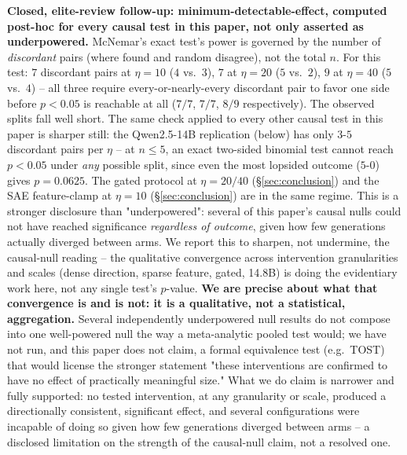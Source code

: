 \documentclass[onecolumn]{jmlr}
\begin{document}
\textbf{Closed, elite-review follow-up: minimum-detectable-effect,
computed post-hoc for every causal test in this paper, not only
asserted as underpowered.} McNemar's exact test's power is governed by
the number of \emph{discordant} pairs (where found and random
disagree), not the total $n$. For this test: $7$ discordant pairs at
$\eta=10$ ($4$ vs.\ $3$), $7$ at $\eta=20$ ($5$ vs.\ $2$), $9$ at
$\eta=40$ ($5$ vs.\ $4$) -- all three require every-or-nearly-every
discordant pair to favor one side before $p<0.05$ is reachable at all
($7/7$, $7/7$, $8/9$ respectively). The observed splits fall well short.
The same check applied to every other causal test in this paper is
sharper still: the Qwen2.5-14B replication (below) has only $3$-$5$
discordant pairs per $\eta$ -- at $n\leq5$, an exact two-sided binomial
test cannot reach $p<0.05$ under \emph{any} possible split, since even
the most lopsided outcome ($5$-$0$) gives $p=0.0625$. The gated
protocol at $\eta=20/40$ (\S\ref{sec:conclusion}) and the SAE
feature-clamp at $\eta=10$ (\S\ref{sec:conclusion}) are in the same
regime. This is a stronger disclosure than "underpowered": several of
this paper's causal nulls could not have reached significance
\emph{regardless of outcome}, given how few generations actually
diverged between arms. We report this to sharpen, not undermine, the
causal-null reading -- the qualitative convergence across intervention
granularities and scales (dense direction, sparse feature, gated,
14.8B) is doing the evidentiary work here, not any single test's
$p$-value. \textbf{We are precise about what that convergence is and is
not: it is a qualitative, not a statistical, aggregation.} Several
independently underpowered null results do not compose into one
well-powered null the way a meta-analytic pooled test would; we have
not run, and this paper does not claim, a formal equivalence test
(e.g.\ TOST) that would license the stronger statement "these
interventions are confirmed to have no effect of practically meaningful
size." What we do claim is narrower and fully supported: no tested
intervention, at any granularity or scale, produced a directionally
consistent, significant effect, and several configurations were
incapable of doing so given how few generations diverged between arms
-- a disclosed limitation on the strength of the causal-null claim, not
a resolved one.
\end{document}
